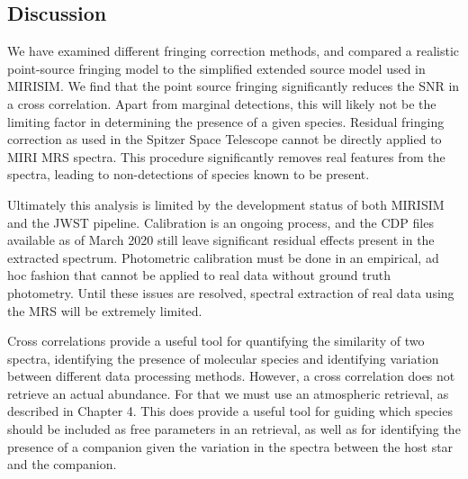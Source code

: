 \subsection{Discussion}
We have examined different fringing correction methods, and compared a realistic point-source fringing model to the simplified extended source model used in MIRISIM.
We find that the point source fringing significantly reduces the SNR in a cross correlation. 
Apart from marginal detections, this will likely not be the limiting factor in determining the presence of a given species.
Residual fringing correction as used in the Spitzer Space Telescope cannot be directly applied to MIRI MRS spectra. 
This procedure significantly removes real features from the spectra, leading to non-detections of species known to be present.

Ultimately this analysis is limited by the development status of both MIRISIM and the JWST pipeline. 
Calibration is an ongoing process, and the CDP files available as of March 2020 still leave significant residual effects present in the extracted spectrum.
Photometric calibration must be done in an empirical, ad hoc fashion that cannot be applied to real data without ground truth photometry.
Until these issues are resolved, spectral extraction of real data using the MRS will be extremely limited.

Cross correlations provide a useful tool for quantifying the similarity of two spectra, identifying the presence of molecular species and identifying variation between different data processing methods.
However, a cross correlation does not retrieve an actual abundance.
For that we must use an atmospheric retrieval, as described in Chapter 4.
This does provide a useful tool for guiding which species should be included as free parameters in an retrieval, as well as for identifying the presence of a companion given the variation in the spectra between the host star and the companion.